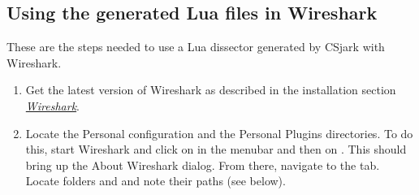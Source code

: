 \documentclass[A4paper,10pt,english]{sphinxmanual}
\begin{document}
\subsection{Using the generated Lua files in Wireshark}
\label{user/use_ws:using-the-generated-lua-files-in-wireshark}\label{user/use_ws::doc}
These are the steps needed to use a Lua dissector generated by CSjark with Wireshark.
\begin{enumerate}
\item {} 
Get the latest version of Wireshark as described in the installation section {\hyperref[user/install:ws]{\emph{Wireshark}}}.

\item {} 
Locate the Personal configuration and the Personal Plugins directories. To do this, start Wireshark and click on  in the menubar and then on . This should bring up the About Wireshark dialog. From there, navigate to the  tab. Locate folders  and  and note their paths (see below).

\end{enumerate}
\end{document}
